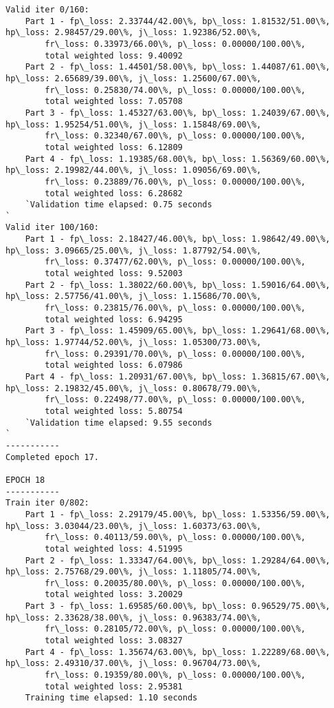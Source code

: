 \documentclass[11pt]{article}
\begin{document}
\begin{Verbatim}[commandchars=\\\{\}]
Valid iter 0/160:
	Part 1 - fp\_loss: 2.33744/42.00\%, bp\_loss: 1.81532/51.00\%, hp\_loss: 2.98457/29.00\%, j\_loss: 1.92386/52.00\%, 
		fr\_loss: 0.33973/66.00\%, p\_loss: 0.00000/100.00\%, 
		total weighted loss: 9.40092
	Part 2 - fp\_loss: 1.44501/58.00\%, bp\_loss: 1.44087/61.00\%, hp\_loss: 2.65689/39.00\%, j\_loss: 1.25600/67.00\%, 
		fr\_loss: 0.25830/74.00\%, p\_loss: 0.00000/100.00\%, 
		total weighted loss: 7.05708
	Part 3 - fp\_loss: 1.45327/63.00\%, bp\_loss: 1.24039/67.00\%, hp\_loss: 1.95254/51.00\%, j\_loss: 1.15848/69.00\%, 
		fr\_loss: 0.32340/67.00\%, p\_loss: 0.00000/100.00\%, 
		total weighted loss: 6.12809
	Part 4 - fp\_loss: 1.19385/68.00\%, bp\_loss: 1.56369/60.00\%, hp\_loss: 2.19982/44.00\%, j\_loss: 1.09056/69.00\%, 
		fr\_loss: 0.23889/76.00\%, p\_loss: 0.00000/100.00\%, 
		total weighted loss: 6.28682
	`Validation time elapsed: 0.75 seconds
`
Valid iter 100/160:
	Part 1 - fp\_loss: 2.18427/46.00\%, bp\_loss: 1.98642/49.00\%, hp\_loss: 3.09665/25.00\%, j\_loss: 1.87792/54.00\%, 
		fr\_loss: 0.37477/62.00\%, p\_loss: 0.00000/100.00\%, 
		total weighted loss: 9.52003
	Part 2 - fp\_loss: 1.38022/60.00\%, bp\_loss: 1.59016/64.00\%, hp\_loss: 2.57756/41.00\%, j\_loss: 1.15686/70.00\%, 
		fr\_loss: 0.23815/76.00\%, p\_loss: 0.00000/100.00\%, 
		total weighted loss: 6.94295
	Part 3 - fp\_loss: 1.45909/65.00\%, bp\_loss: 1.29641/68.00\%, hp\_loss: 1.97744/52.00\%, j\_loss: 1.05300/73.00\%, 
		fr\_loss: 0.29391/70.00\%, p\_loss: 0.00000/100.00\%, 
		total weighted loss: 6.07986
	Part 4 - fp\_loss: 1.20931/67.00\%, bp\_loss: 1.36815/67.00\%, hp\_loss: 2.19832/45.00\%, j\_loss: 0.80678/79.00\%, 
		fr\_loss: 0.22498/77.00\%, p\_loss: 0.00000/100.00\%, 
		total weighted loss: 5.80754
	`Validation time elapsed: 9.55 seconds
`
-----------
Completed epoch 17.

EPOCH 18
-----------
Train iter 0/802:
	Part 1 - fp\_loss: 2.29179/45.00\%, bp\_loss: 1.53356/59.00\%, hp\_loss: 3.03044/23.00\%, j\_loss: 1.60373/63.00\%, 
		fr\_loss: 0.40113/59.00\%, p\_loss: 0.00000/100.00\%, 
		total weighted loss: 4.51995
	Part 2 - fp\_loss: 1.33347/64.00\%, bp\_loss: 1.29284/64.00\%, hp\_loss: 2.75768/29.00\%, j\_loss: 1.11805/74.00\%, 
		fr\_loss: 0.20035/80.00\%, p\_loss: 0.00000/100.00\%, 
		total weighted loss: 3.20029
	Part 3 - fp\_loss: 1.69585/60.00\%, bp\_loss: 0.96529/75.00\%, hp\_loss: 2.33628/38.00\%, j\_loss: 0.96383/74.00\%, 
		fr\_loss: 0.28105/72.00\%, p\_loss: 0.00000/100.00\%, 
		total weighted loss: 3.08327
	Part 4 - fp\_loss: 1.35674/63.00\%, bp\_loss: 1.22289/68.00\%, hp\_loss: 2.49310/37.00\%, j\_loss: 0.96704/73.00\%, 
		fr\_loss: 0.19359/80.00\%, p\_loss: 0.00000/100.00\%, 
		total weighted loss: 2.95381
	Training time elapsed: 1.10 seconds


\end{Verbatim}
\end{document}
